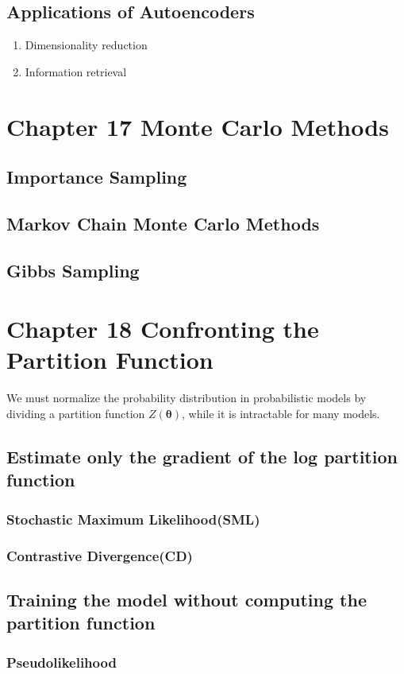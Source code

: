 \documentclass[12pt]{article}
\numberwithin{equation}{section}
\begin{document}
\subsection{Applications of Autoencoders}
\begin{enumerate}
	\item Dimensionality reduction
	\item Information retrieval
\end{enumerate}
\section{Chapter 17 Monte Carlo Methods}
\subsection{Importance Sampling}
\subsection{Markov Chain Monte Carlo Methods}
\subsection{Gibbs Sampling}
\section{Chapter 18 Confronting the Partition Function}
We must normalize the probability distribution in probabilistic models by dividing a partition function $Z(\bm{\theta})$, while it is intractable for many models.
\subsection{Estimate only the gradient of the log partition function}
\subsubsection{Stochastic Maximum Likelihood(SML)}
\subsubsection{Contrastive Divergence(CD)}
\subsection{Training the model without computing the partition function}
\subsubsection{Pseudolikelihood}
\end{document}
